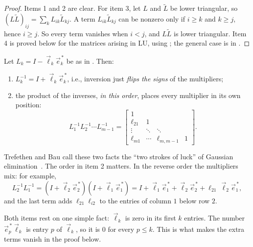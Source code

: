 \begin{proof}
  Items 1 and 2 are clear. For item 3, let $L$ and $\tilde{L}$ be lower triangular, so $(L\tilde{L})_{ij} = \sum_k L_{ik}\tilde{L}_{kj}$. A term $L_{ik}\tilde{L}_{kj}$ can be nonzero only if $i \ge k$ and $k \ge j$, hence $i \ge j$. So every term vanishes when $i < j$, and $L\tilde{L}$ is lower triangular. Item 4 is proved below for the matrices arising in LU, using ; the general case is in .
\end{proof}

\begin{theorem}
  \label{thm:elem-inverse}
  Let $L_k = I - \vec{\ell}_k\vec{e}_k^{\,\ast}$ be as in . Then:
  \begin{enumerate}
    \item $L_k^{-1} = I + \vec{\ell}_k\vec{e}_k^{\,\ast}$, i.e., inversion just \emph{flips the signs} of the multipliers;
    \item the product of the inverses, \emph{in this order}, places every multiplier in its own position:
    \begin{equation}
      \label{eq:L-multipliers}
      L_1^{-1} L_2^{-1} \cdots L_{m-1}^{-1} =
      \begin{bmatrix}
        1 & & & \\
        \ell_{21} & 1 & & \\
        \vdots & \ddots & \ddots & \\
        \ell_{m1} & \cdots & \ell_{m,m-1} & 1
      \end{bmatrix}.
    \end{equation}
  \end{enumerate}
\end{theorem}

Trefethen and Bau call these two facts the ``two strokes of luck'' of Gaussian elimination~\cite[Lecture 20]{TB}. The order in item 2 matters. In the reverse order the multipliers mix: for example,
\begin{equation}
  L_2^{-1}L_1^{-1} = (I + \vec{\ell}_2\vec{e}_2^{\,\ast})(I + \vec{\ell}_1\vec{e}_1^{\,\ast}) = I + \vec{\ell}_1\vec{e}_1^{\,\ast} + \vec{\ell}_2\vec{e}_2^{\,\ast} + \ell_{21}\,\vec{\ell}_2\vec{e}_1^{\,\ast},
\end{equation}
and the last term adds $\ell_{21}\ell_{i2}$ to the entries of column $1$ below row $2$.

Both items rest on one simple fact: $\vec{\ell}_k$ is zero in its first $k$ entries. The number $\vec{e}_p^{\,\ast}\vec{\ell}_k$ is entry $p$ of $\vec{\ell}_k$, so it is $0$ for every $p \le k$. This is what makes the extra terms vanish in the proof below.


